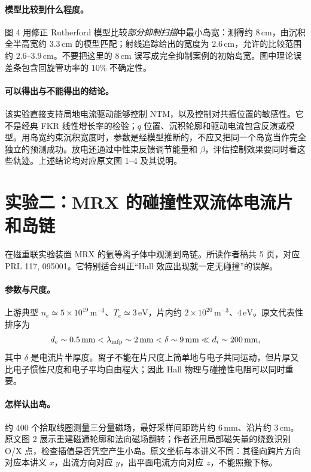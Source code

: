 \paragraph{模型比较到什么程度。}
图 4 用修正 Rutherford 模型比较\emph{部分抑制扫描}中最小岛宽：测得约 $8\,\mathrm{cm}$，由沉积全半高宽约 $3.3\,\mathrm{cm}$ 的模型匹配；射线追踪给出的宽度为 $2.6\,\mathrm{cm}$，允许的比较范围约 $2.6$--$3.9\,\mathrm{cm}$。不要把这里的 $8\,\mathrm{cm}$ 误写成完全抑制案例的初始岛宽。图中理论误差条包含回旋管功率的 $10\%$ 不确定性。

\paragraph{可以得出与不能得出的结论。}
该实验直接支持局地电流驱动能够控制 NTM，以及控制对共振位置的敏感性。它不是经典 FKR 线性增长率的检验；$q$ 位置、沉积轮廓和驱动电流包含反演或模型。用岛宽约束沉积宽度时，参数是经模型推断的，不应又把同一个岛宽当作完全独立的预测成功。放电还通过中性束反馈调节能量和 $\beta$，评估控制效果要同时看这些轨迹。上述结论均对应原文图 1--4 及其说明。\citep{TMPetty2003}

\section{实验二：MRX 的碰撞性双流体电流片和岛链}
\label{tm:sec:mrx}

\citet{TMJaraAlmonte2016} 在磁重联实验装置 MRX 的氩等离子体中观测到岛链。所读作者稿共 5 页，对应 PRL 117, 095001。它特别适合纠正“Hall 效应出现就一定无碰撞”的误解。

\paragraph{参数与尺度。}
上游典型 $n_e\simeq5\times10^{19}\,\mathrm{m^{-3}}$、$T_e\simeq3\,\mathrm{eV}$，片内约 $2\times10^{20}\,\mathrm{m^{-3}}$、$4\,\mathrm{eV}$。原文代表性排序为
\begin{equation}
 d_e\sim0.5\,\mathrm{mm}
 <\lambda_{\rm mfp}\sim2\,\mathrm{mm}
 <\delta\sim9\,\mathrm{mm}
 \ll d_i\sim200\,\mathrm{mm},
 \label{tm:mrx_scales}
\end{equation}
其中 $\delta$ 是电流片半厚度。离子不能在片尺度上简单地与电子共同运动，但片厚又比电子惯性尺度和电子平均自由程大；因此 Hall 物理与碰撞性电阻可以同时重要。

\paragraph{怎样认出岛。}
约 400 个拾取线圈测量三分量磁场，最好采样间距跨片约 $6\,\mathrm{mm}$、沿片约 $3\,\mathrm{cm}$。原文图 2 展示重建磁通轮廓和法向磁场翻转；作者还用局部磁矢量的绕数识别 O/X 点，检查插值是否凭空产生小岛。原文坐标与本讲义不同：其径向跨片方向对应本讲义 $x$，出流方向对应 $y$，出平面电流方向对应 $z$，不能照搬下标。


